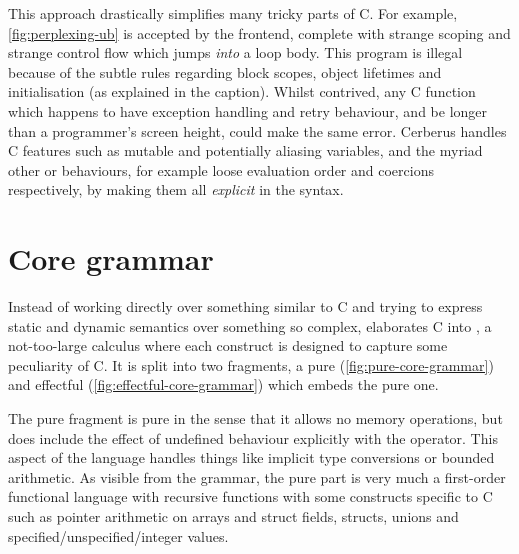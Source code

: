 This approach drastically simplifies many tricky parts of C. For example,
\cref{fig:perplexing-ub} is accepted by the frontend, complete with strange
scoping and strange control flow which jumps \emph{into} a loop body. This
program is illegal because of the subtle rules regarding block scopes, object
lifetimes and initialisation (as explained in the caption). Whilst contrived,
any C function which happens to have exception handling and retry behaviour,
and be longer than a programmer's screen height, could make the same error.
Cerberus handles C features such as mutable and potentially aliasing variables,
and the myriad other  or  behaviours, for
example loose evaluation order and coercions respectively, by making them all
\emph{explicit} in the syntax.

\begin{marginfigure}
    \caption{Example of subtle scoping and control-flow issues leading to UB
        (courtesy~\cite[p70]{memarian2022cerberus}).
        Jumping to  starts the lifetime of an object, but does not
        initialise it. Jumping to  then \emph{ends that lifetime}
        because it exits the block (lines 5\textendash{}12). By the time
        execution reaches line 8,  \emph{refers to a dead object}.
        This is why the seemingly redundant re-assignment of 
        on line 7 would prevent UB in this example.}\label{fig:perplexing-ub}
\end{marginfigure}

\section{Core grammar}\label{sec:core-grammar}

Instead of working directly over something similar to C and trying to express
static and dynamic semantics over something so complex, 
elaborates C into , a not-too-large calculus where each construct
is designed to capture some peculiarity of C. It is split into two fragments, a
pure (\cref{fig:pure-core-grammar}) and effectful
(\cref{fig:effectful-core-grammar}) which embeds the pure one.

The pure fragment is pure in the sense that it allows no memory operations, but does
include the effect of undefined behaviour explicitly with the
 operator. This aspect of the language handles %
things like implicit type conversions or bounded arithmetic. As visible from the
grammar, the pure part is very much a first-order functional language with
recursive functions with some constructs specific to C such as pointer
arithmetic on arrays and struct fields, structs, unions and
specified/unspecified/integer values.

